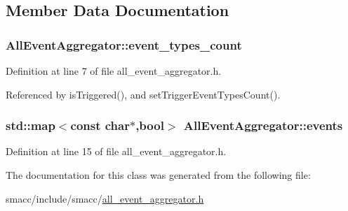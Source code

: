 \subsection{Member Data Documentation}
\subsubsection[{\texorpdfstring{event\+\_\+types\+\_\+count}{event_types_count}}]{ All\+Event\+Aggregator\+::event\+\_\+types\+\_\+count\hspace{0.3cm}{\ttfamily [private]}}\hypertarget{classAllEventAggregator_a8b64cd4c8d8592916a19c628b61606cd}{}\label{classAllEventAggregator_a8b64cd4c8d8592916a19c628b61606cd}


Definition at line 7 of file all\+\_\+event\+\_\+aggregator.\+h.



Referenced by is\+Triggered(), and set\+Trigger\+Event\+Types\+Count().

\subsubsection[{\texorpdfstring{events}{events}}]{\setlength{\rightskip}{0pt plus 5cm}std\+::map$<$const char$\ast$,{\bf bool}$>$ All\+Event\+Aggregator\+::events}\hypertarget{classAllEventAggregator_af9de1c3e60421aa0b1a4979340fc4765}{}\label{classAllEventAggregator_af9de1c3e60421aa0b1a4979340fc4765}


Definition at line 15 of file all\+\_\+event\+\_\+aggregator.\+h.



The documentation for this class was generated from the following file\+:\begin{DoxyCompactItemize}
\item 
smacc/include/smacc/\hyperlink{all__event__aggregator_8h}{all\+\_\+event\+\_\+aggregator.\+h}\end{DoxyCompactItemize}

